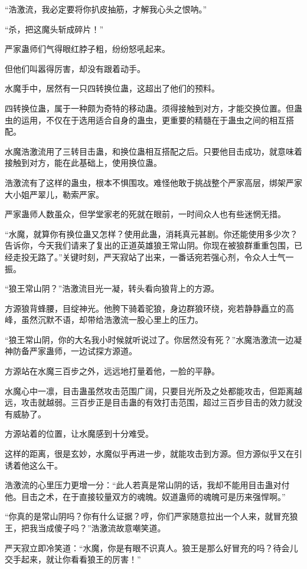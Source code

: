 \begin{this_body}
“浩激流，我必定要将你扒皮抽筋，才解我心头之恨呐。”

“杀，把这魔头斩成碎片！”

严家蛊师们气得眼红脖子粗，纷纷怒吼起来。

但他们叫嚣得厉害，却没有跟着动手。

水魔手中，居然有一只四转换位蛊，这超出了他们的预料。

四转换位蛊，属于一种颇为奇特的移动蛊。须得接触到对方，才能交换位置。但蛊虫的运用，不仅在于选用适合自身的蛊虫，更重要的精髓在于蛊虫之间的相互搭配。

水魔浩激流用了三转目击蛊，和换位蛊相互搭配之后。只要他目击成功，就意味着接触到对方，能在此基础上，使用换位蛊。

浩激流有了这样的蛊虫，根本不惧围攻。难怪他敢于挑战整个严家高层，绑架严家大小姐严翠儿，勒索严家。

严家蛊师人数虽众，但学堂家老的死就在眼前，一时间众人也有些迷惘无措。

“水魔，就算你有换位蛊又怎样？使用此蛊，消耗真元甚剧。你还能使用多少次？告诉你，今天我们请来了复出的正道英雄狼王常山阴。你现在被狼群重重包围，已经走投无路了。”关键时刻，严天寂站了出来，一番话宛若强心剂，令众人士气一振。

“狼王常山阴？”浩激流目光一凝，转头看向狼背上的方源。

方源狼背蜂腰，目绽神光。他胯下骑着驼狼，身边群狼环绕，宛若静静矗立的高峰，虽然沉默不语，却带给浩激流一股心里上的压力。

“狼王常山阴，你的大名我小时候就听说过了。你居然没有死？”水魔浩激流一边凝神防备严家蛊师，一边试探方源道。

方源站在水魔三百步之外，远远地打量着他，一脸的平静。

水魔心中一凛，目击蛊虽然攻击范围广阔，只要目光所及之处都能攻击，但距离越远，攻击就越弱。三百步正是目击蛊的有效打击范围，超过三百步目击的效力就没有威胁了。

方源站着的位置，让水魔感到十分难受。

这样的距离，很是玄妙，水魔似乎再进一步，就能攻击到方源。但方源似乎又在引诱着他这么干。

浩激流的心里压力更增一分：“此人若真是常山阴的话，我却不能用目击蛊对付他。目击之术，在于直接较量双方的魂魄。奴道蛊师的魂魄可是历来强悍啊。”

“你真的是常山阴吗？你有什么证据？哼，你们严家随意拉出一个人来，就冒充狼王，把我当成傻子吗？”浩激流故意嘲笑道。

严天寂立即冷笑道：“水魔，你是有眼不识真人。狼王是那么好冒充的吗？待会儿交手起来，就让你看看狼王的厉害！”


\end{this_body}
